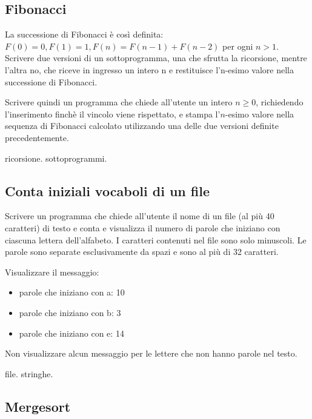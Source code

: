 \subsection{Fibonacci}

La successione di Fibonacci \`e cos\`i definita: $F(0) = 0, F(1) = 1, F(n) = F(n-1) + F(n-2)$ per ogni $n > 1$.
Scrivere due versioni di un sottoprogramma, una che sfrutta la ricorsione, mentre l'altra no, che riceve in ingresso un intero n e restituisce l'n-esimo valore nella successione di Fibonacci.

Scrivere quindi un programma che chiede all'utente un intero $n \geq 0$, richiedendo l'inserimento finch\`e il vincolo viene rispettato, e stampa l'$n$-esimo valore nella sequenza di Fibonacci calcolato utilizzando una delle due versioni definite precedentemente.

\begin{tags}
ricorsione. sottoprogrammi.
\end{tags}



\subsection{Conta iniziali vocaboli di un file}

Scrivere un programma che chiede all'utente il nome di un file (al pi\`u 40 caratteri) di testo e conta e visualizza il numero di parole che iniziano con ciascuna lettera dell'alfabeto. 
I caratteri contenuti nel file sono solo minuscoli. 
Le parole sono separate esclusivamente da spazi e sono al pi\`u di 32 caratteri. 

Visualizzare il messaggio:
\begin{itemize}
    \item parole che iniziano con a: 10
    \item parole che iniziano con b: 3
    \item parole che iniziano con e: 14
\end{itemize}

Non visualizzare alcun messaggio per le lettere che non hanno parole nel testo.

\begin{tags}
file. stringhe.
\end{tags}


\subsection{Mergesort}

